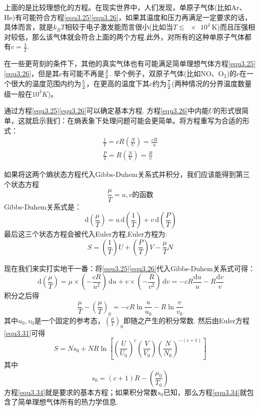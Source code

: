 上面的是比较理想化的方程。在现实世界中，人们发现，单原子气体(比如Ar、He)有可能符合方程\eqref{equ3.25}\eqref{equ3.26}，如果其温度和压力再满足一定要求的话，具体而言，就是$k_BT$相较于电子激发能而言很小(比如当$T\lesssim \SI{e4}{\kelvin}$)而且压强相对较低，那么该气体就会符合上面的两个方程.此外，对所有的这种单原子气体都有$c=\frac{3}{2}$.

在一些更苛刻的条件下，其他的真实气体也有可能满足简单理想气体方程\eqref{equ3.25}\eqref{equ3.26}，但是其$c$有可能不再是$3\over2$. 举个例子，双原子气体(比如NO、O$_2$)的$c$在一个很大的温度范围内约为${5\over2}$，在更高的温度下其$c$约为$7\over2$(两种情况的分界温度数量级一般在$10^3K$)。

通过方程\eqref{equ3.25}\eqref{equ3.26}可以确定基本方程. 方程\eqref{equ3.26}中内能$U$的形式很简单，这就启示我们：在熵表象下处理问题可能会更简单。将方程重写为合适的形式：
\begin{align}
\frac{1}{T}=cR\left(\frac{N}{U}\right)=\frac{cR}{u}\label{equ3.27}\\
\frac{P}{T}=R\left(\frac{N}{V}\right)=\frac{R}{v}\label{equ3.28}
\end{align}

如果将这两个熵状态方程代入Gibbs-Duhem关系式并积分，我们应该能得到第三个状态方程
\begin{equation}
\label{equ3.29}
\frac{\mu}{T}=u,v\text{的函数}
\end{equation}
Gibbs-Duhem关系式是：
\begin{equation}
\label{equ3.30}
\,\text{d}\left(\frac{\mu}{T}\right)=u\,\text{d}\left(\frac{1}{T}\right)+v\,\text{d}\left(\frac{P}{T}\right)
\end{equation}
最后这三个状态方程会被代入Euler方程,Euler方程为:
\begin{equation}
\label{equ3.31}
S = \left( \frac{1}{T} \right) U + \left( \frac{P}{T} \right) V - \frac{\mu}{T} N
\end{equation}

现在我们来实打实地干一番：将\eqref{equ3.25}\eqref{equ3.26}代入Gibbs-Duhem关系式可得：
\begin{equation}
\label{equ3.32}
\,\text{d}\left(\frac{\mu}{T}\right)=\mu\times\left(-\frac{cR}{u^2}\right)\,\text{d}u+v\times\left(-\frac{R}{v^2}\right)\,\text{d}v=-cR\frac{\text{d}u}{u}-R\frac{\text{d}v}{v}
\end{equation}
积分之后得
\begin{equation}
\label{equ3.33}
\frac{\mu}{T}- \left( \frac{\mu}{T} \right)_0 = -cR\ln{\frac{u}{u_0}}-R\ln{\frac{v}{v_0}}
\end{equation}
其中$u_0,v_0$是一个固定的参考态，$\displaystyle{ \left( \frac{\mu}{T} \right)_0 }$即随之产生的积分常数. 然后由Euler方程\eqref{equ3.31}可得
\begin{equation}
\label{equ3.34}
S=Ns_0+NR\ln\left[\left(\frac{U}{U_0}\right)^c\left(\frac{V}{V_0}\right)\left(\frac{N}{N_0}\right)^{-(c+1)}\right]
\end{equation}
其中
\begin{equation}
\label{equ3.35}
s_0=(c+1)R-\left(\frac{\mu_0}{T_0}\right)
\end{equation}
方程\eqref{equ3.34}就是要求的基本方程；如果积分常数$s_0$已知，那么方程\eqref{equ3.34}就包含了简单理想气体所有的热力学信息.

